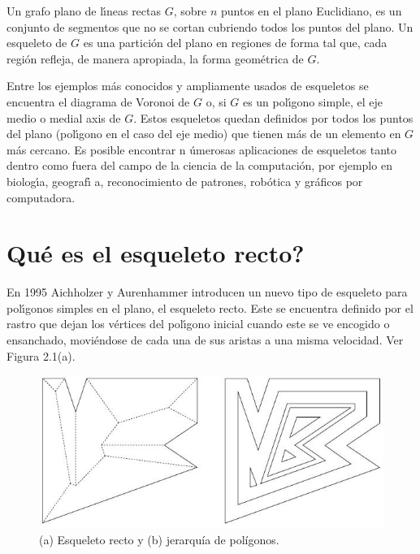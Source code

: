 \documentclass[12pt,english]{report}
\begin{document}
Un grafo plano de l\'{\i}neas rectas $G$, sobre $n$ puntos en el plano
Euclidiano, es un conjunto de segmentos que no se cortan cubriendo todos los
puntos del plano. Un esqueleto de $G$ es una partici\'{o}n del plano en
regiones de forma tal que, cada regi\'{o}n refleja, de manera apropiada, la
forma geom\'{e}trica de $G$.

Entre los ejemplos m\'{a}s conocidos y ampliamente usados de esqueletos se
encuentra el diagrama de Voronoi de $G$ o, si $G$ es un pol\'{\i}gono
simple, el eje medio o medial axis de $G$. Estos esqueletos quedan definidos
por todos los puntos del plano (pol\'{\i}gono en el caso del eje medio) que
tienen m\'{a}s de un elemento en $G$ m\'{a}s cercano. Es posible encontrar n%
\'{u}merosas aplicaciones de esqueletos tanto dentro como fuera del campo de
la ciencia de la computaci\'{o}n, por ejemplo en biolog\'{\i}a, geograf\'{\i}%
a, reconocimiento de patrones, rob\'{o}tica y gr\'{a}ficos por computadora.

\section{\textquestiondown Qu\'{e} es el esqueleto recto?}

En 1995 Aichholzer y Aurenhammer \cite{AA} introducen un nuevo tipo de esqueleto para
pol\'{\i}gonos simples en el plano, el esqueleto recto. Este se encuentra
definido por el rastro que dejan los v\'{e}rtices del pol\'{\i}gono inicial
cuando este se ve encogido o ensanchado, movi\'{e}ndose de cada una de sus
aristas a una misma velocidad. Ver Figura 2.1(a).

\begin{figure}[htbp]
\begin{center}
\includegraphics{jerar.jpg}
\end{center}
\caption{(a) Esqueleto recto y (b) jerarqu\'ia de pol\'igonos.}
\end{figure}
\end{document}
